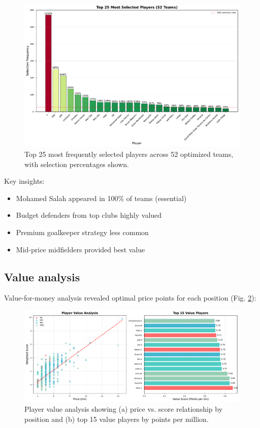 \documentclass[10pt,a4paper,twocolumn]{article}
\begin{document}
\begin{figure}[h]
\centering
\includegraphics[width=\columnwidth]{figures/player_selection_frequency.pdf}
\caption{Top 25 most frequently selected players across 52 optimized teams, with selection percentages shown.}
\label{fig:selection_frequency}
\end{figure}

Key insights:
\begin{itemize}
\item Mohamed Salah appeared in 100\% of teams (essential)
\item Budget defenders from top clubs highly valued
\item Premium goalkeeper strategy less common
\item Mid-price midfielders provided best value
\end{itemize}

\subsection*{Value analysis}

Value-for-money analysis revealed optimal price points for each position (Fig. \ref{fig:value_analysis}):

\begin{figure}[h]
\centering
\includegraphics[width=\columnwidth]{figures/value_analysis.pdf}
\caption{Player value analysis showing (a) price vs. score relationship by position and (b) top 15 value players by points per million.}
\label{fig:value_analysis}
\end{figure}
\end{document}
